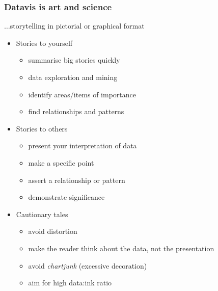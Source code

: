 
\begin{frame}
  \frametitle{Datavis is art and science}
    $\ldots$storytelling in pictorial or graphical format \\
      \begin{itemize}  
        \item <1->\textcolor{hutton_green}{Stories to yourself}
        \begin{itemize}
          \item <2->summarise big stories quickly
          \item <2->data exploration and mining
          \item <2->identify areas/items of importance
          \item <2->find relationships and patterns
        \end{itemize}
        \item <1->\textcolor{hutton_blue}{Stories to others}
        \begin{itemize}
          \item <3->present your interpretation of data
          \item <3->make a specific point
          \item <3->assert a relationship or pattern
          \item <3->demonstrate significance
        \end{itemize}
        \item <1->\textcolor{hutton_purple}{Cautionary tales}
        \begin{itemize}
          \item <4->avoid distortion
          \item <4->make the reader think about the data, not the presentation
          \item <4->avoid \textit{chartjunk} (excessive decoration)
          \item <4->aim for high data:ink ratio
        \end{itemize}
      \end{itemize}  
\end{frame}


